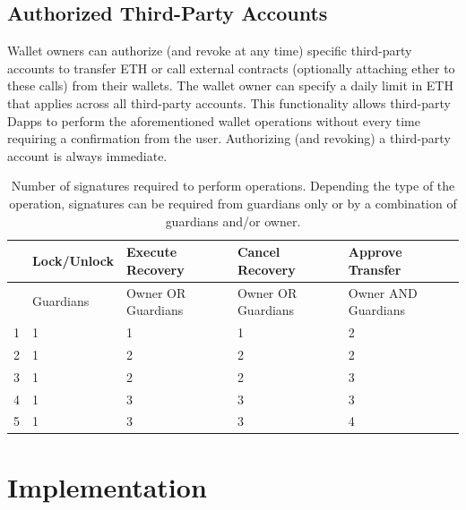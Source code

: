 \documentclass[12pt]{article}
\begin{document}
\subsection{Authorized Third-Party Accounts}

Wallet owners can authorize (and revoke at any time) specific third-party accounts to transfer ETH or call external contracts (optionally attaching ether to these calls) from their wallets. The wallet owner can specify a daily limit in ETH that applies across all third-party accounts. This functionality allows third-party Dapps to perform the aforementioned wallet operations without every time requiring a confirmation from the user. Authorizing (and revoking) a third-party account is always immediate.

\begin{table}[ht]
    \begin{tabular}{ |c|m{6em}|m{8em}|m{8em}|m{8em}| }
     \hline
       & Lock/Unlock & Execute Recovery   & Cancel Recovery    & Approve Transfer \\
     \hline \hline
       & Guardians   & Owner OR Guardians & Owner OR Guardians & Owner AND Guardians \\
     \hline
     1 & 1 & 1 & 1 & 2 \\
     2 & 1 & 2 & 2 & 2 \\
     3 & 1 & 2 & 2 & 3 \\
     4 & 1 & 3 & 3 & 3 \\
     5 & 1 & 3 & 3 & 4 \\
     \hline

    \end{tabular}
    \caption{Number of signatures required to perform operations. Depending the type of the operation, signatures can be required from guardians only or by a combination of guardians and/or owner.}
\end{table}

\section{Implementation}
\end{document}

